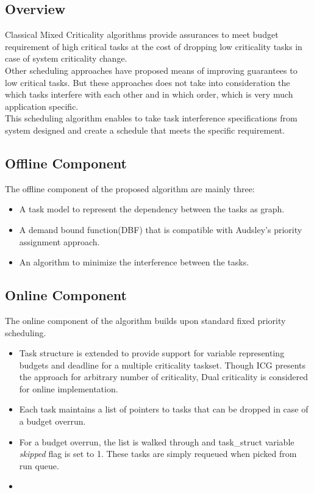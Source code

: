 \subsection{Overview}
Classical Mixed Criticality algorithms provide assurances to meet budget requirement of high critical tasks at the cost of dropping low criticality tasks in case of system criticality change.\\
Other scheduling approaches have proposed means of improving guarantees to low critical tasks. But these approaches does not take into consideration the which tasks interfere with each other and in which order, which is very much application specific.\\
This scheduling algorithm enables to take task interference specifications from system designed and create a schedule that meets the specific requirement. 
\subsection{Offline Component}
The offline component of the proposed algorithm are mainly three:\\
\begin{itemize}
	\item A task model to represent the dependency between the tasks as graph.
	\item A demand bound function(DBF) that is compatible with Audsley's priority assignment approach.
	\item An algorithm to minimize the interference between the tasks.
\end{itemize}
\subsection{Online Component}
The online component of the algorithm builds upon standard fixed priority scheduling.
\begin{itemize}
	\item Task structure is extended to provide support for variable representing budgets and deadline for a multiple criticality taskset. Though ICG presents the approach for arbitrary number of criticality, Dual criticality is considered for online implementation.
	\item Each task maintains a list of pointers to tasks that can be dropped in case of a budget overrun.
	\item For a budget overrun, the list is walked through and task\_struct variable \textit{skipped} flag is set to 1. These tasks are simply requeued when picked from run queue.
\end{itemize}
\begin{itemize}
	\item 
\end{itemize}

